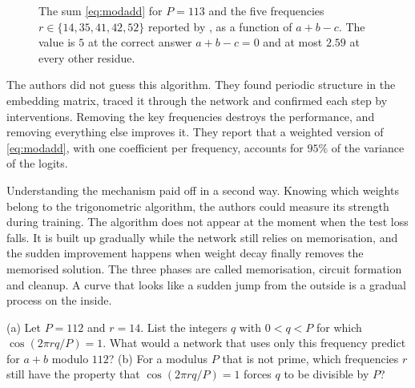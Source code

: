 \begin{figure}[t]
\centering
{}
\caption{The sum \eqref{eq:modadd} for $P=113$ and the five frequencies $r\in\{14,35,41,42,52\}$ reported by
\citet{nanda2023progress}, as a function of $a+b-c$. The value is $5$ at the correct answer $a+b-c=0$ and at
most $2.59$ at every other residue.}
\label{fig:modadd}
\end{figure}

The authors did not guess this algorithm. They found periodic structure in the embedding matrix, traced it
through the network and confirmed each step by interventions. Removing the key frequencies destroys the
performance, and removing everything else improves it. They report that a weighted version of \eqref{eq:modadd}, with one coefficient per frequency, accounts for $95\%$
of the variance of the logits.

Understanding the mechanism paid off in a second way. Knowing which weights belong to the trigonometric
algorithm, the authors could measure its strength during training. The algorithm does not appear at the moment
when the test loss falls. It is built up gradually while the network still relies on memorisation, and the
sudden improvement happens when weight decay finally removes the memorised solution. The three phases are
called memorisation, circuit formation and cleanup. A curve that looks like a sudden jump from the outside is a
gradual process on the inside.

\begin{exercise}\label{ex:cosprime}
(a) Let $P=112$ and $r=14$. List the integers $q$ with $0<q<P$ for which $\cos(2\pi rq/P)=1$. What would a network
that uses only this frequency predict for $a+b$ modulo $112$? (b) For a modulus $P$ that is not prime, which
frequencies $r$ still have the property that $\cos(2\pi rq/P)=1$ forces $q$ to be divisible by $P$?
\end{exercise}


